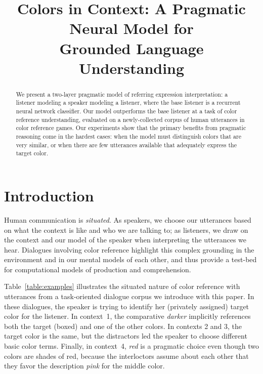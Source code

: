 \documentclass[11pt,letterpaper]{article}
\title{Colors in Context: A Pragmatic Neural Model for \\
Grounded Language Understanding}
\author{}
\date{}
\newcommand{\word}{\textit}
\renewcommand{\|}{\mid}
\newcommand{\Tabref}[1]{Table~\ref{#1}}
\begin{document}
\maketitle
\begin{abstract}


We present a two-layer pragmatic model of referring expression interpretation:
a listener modeling a speaker modeling a listener, where the base listener is a
recurrent neural network classifier. Our model outperforms the
base listener at a task of color reference understanding, evaluated on a
newly-collected corpus of human utterances in color reference games.
Our experiments show that the primary benefits from pragmatic reasoning come
in the hardest cases: when the model must distinguish colors that are very
similar, or when there are few utterances available that adequately express
the target color.

\end{abstract}

\section{Introduction}


Human communication is \emph{situated}. As speakers, we choose our
utterances based on what the context is like and who we are talking
to; as listeners, we draw on the context and our model of the speaker
when interpreting the utterances we hear. Dialogues involving color
reference highlight this complex grounding in the environment and in
our mental models of each other, and thus provide a test-bed for
computational models of production and comprehension.

\Tabref{table:examples} illustrates the situated nature of color
reference with utterances from a task-oriented dialogue corpus we
introduce with this paper. In these dialogues, the speaker is trying
to identify her (privately assigned) target color for the listener. In
context~1, the comparative \word{darker} implicitly references both
the target (boxed) and one of the other colors. In contexts 2 and 3,
the target color is the same, but the distractors led the speaker to
choose different basic color terms. Finally, in context~4, \word{red}
is a pragmatic choice even though two colors are shades of red,
because the interloctors assume about each other that they favor
the description \word{pink} for the middle color.
\end{document}
